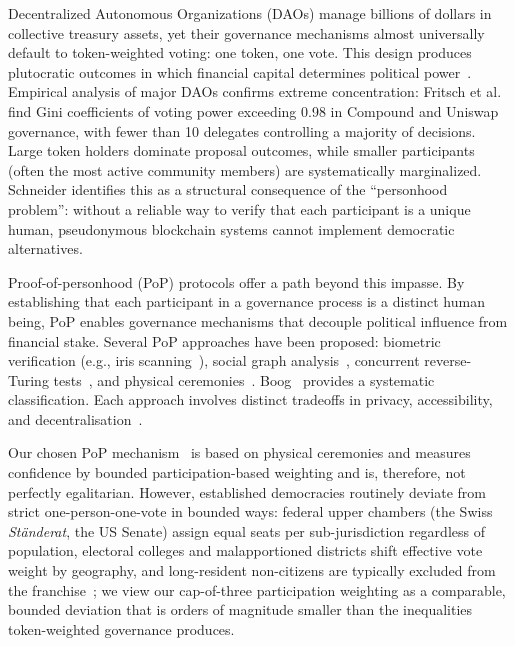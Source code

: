 \documentclass{svproc}
\begin{document}
Decentralized Autonomous Organizations (DAOs) manage billions of dollars in collective treasury assets, yet their governance mechanisms almost universally default to token-weighted voting: one token, one vote. This design produces plutocratic outcomes in which financial capital determines political power~\cite{schneider2024governable}. Empirical analysis of major DAOs confirms extreme concentration: Fritsch et al.~\cite{fritsch2024analyzing} find Gini coefficients of voting power exceeding 0.98 in Compound and Uniswap governance, with fewer than 10 delegates controlling a majority of decisions. Large token holders dominate proposal outcomes, while smaller participants (often the most active community members) are systematically marginalized. Schneider identifies this as a structural consequence of the ``personhood problem'': without a reliable way to verify that each participant is a unique human, pseudonymous blockchain systems cannot implement democratic alternatives.

Proof-of-personhood (PoP) protocols offer a path beyond this impasse. By establishing that each participant in a governance process is a distinct human being, PoP enables governance mechanisms that decouple political influence from financial stake. Several PoP approaches have been proposed: biometric verification (e.g., iris scanning~\cite{worldcoin2023}), social graph analysis~\cite{brightid2020}, concurrent reverse-Turing tests~\cite{idena2019}, and physical ceremonies~\cite{brenzikofer2019encointer,ford2020identity}. Boog~\cite{boog2025} provides a systematic classification. Each approach involves distinct tradeoffs in privacy, accessibility, and decentralisation~\cite{buterin2023biometric}.

Our chosen PoP mechanism~\cite{brenzikofer2019encointer} is based on physical ceremonies and measures confidence by bounded participation-based weighting and is, therefore, not perfectly egalitarian. However, established democracies routinely deviate from strict one-person-one-vote in bounded ways: federal upper chambers (the Swiss \emph{St\"anderat}, the US Senate) assign equal seats per sub-jurisdiction regardless of population, electoral colleges and malapportioned districts shift effective vote weight by geography, and long-resident non-citizens are typically excluded from the franchise~\cite{samuels2001value}; we view our cap-of-three participation weighting as a comparable, bounded deviation that is orders of magnitude smaller than the inequalities token-weighted governance produces.
\end{document}
